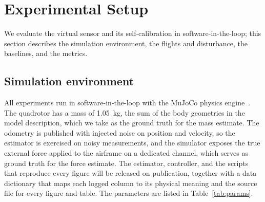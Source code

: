 \documentclass{ieeeaccess}
\begin{document}
\section{Experimental Setup}\label{sec:setup}

We evaluate the virtual sensor and its self-calibration in software-in-the-loop;
this section describes the simulation environment, the flights and disturbance, the
baselines, and the metrics.

\subsection{Simulation environment}
All experiments run in software-in-the-loop with the MuJoCo physics
engine~\cite{todorov2012mujoco}. The quadrotor has a mass of \SI{1.05}{\kilogram},
the sum of the body geometries in the model description, which we take as the
ground truth for the mass estimate. The odometry is published with injected
noise on position and velocity, so the estimator is exercised on noisy
measurements, and
the simulator exposes the true external force applied to the airframe on a
dedicated channel, which serves as ground truth for the force estimate. The
estimator, controller, and the scripts that reproduce every figure will be
released on publication, together with a data dictionary that maps each logged
column to its physical meaning and the source file for every figure and table. The
parameters are listed in Table~\ref{tab:params}.
\end{document}
